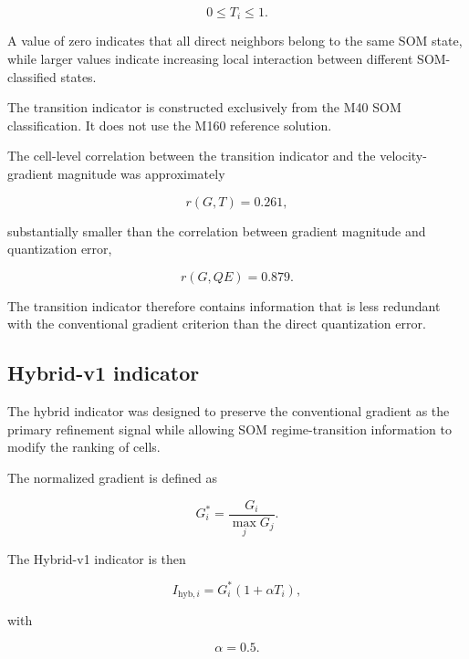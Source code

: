 \begin{equation}
0\leq T_i\leq1.
\end{equation}

A value of zero indicates that all direct neighbors belong to the same SOM
state, while larger values indicate increasing local interaction between
different SOM-classified states.

The transition indicator is constructed exclusively from the M40 SOM
classification. It does not use the M160 reference solution.

The cell-level correlation between the transition indicator and the
velocity-gradient magnitude was approximately

\begin{equation}
r(G,T)=0.261,
\end{equation}

substantially smaller than the correlation between gradient magnitude and
quantization error,

\begin{equation}
r(G,QE)=0.879.
\end{equation}

The transition indicator therefore contains information that is less
redundant with the conventional gradient criterion than the direct
quantization error.

\subsection{Hybrid-v1 indicator}

The hybrid indicator was designed to preserve the conventional gradient as
the primary refinement signal while allowing SOM regime-transition
information to modify the ranking of cells.

The normalized gradient is defined as

\begin{equation}
G_i^{*} =
\frac{G_i}{\max_j G_j}.
\end{equation}

The Hybrid-v1 indicator is then

\begin{equation}
I_{\mathrm{hyb},i}
=
G_i^{*}
\left(1+\alpha T_i\right),
\end{equation}

with

\begin{equation}
\alpha=0.5.
\end{equation}

